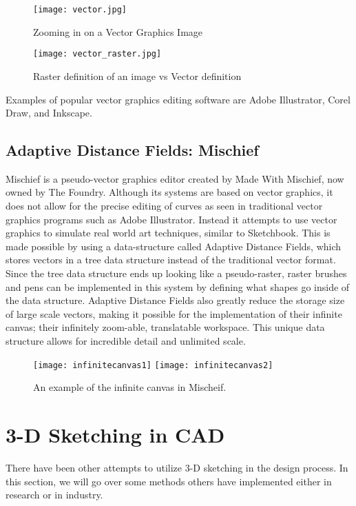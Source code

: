 \begin{figure}
\texttt{[image: vector.jpg]}
\caption{Zooming in on a Vector Graphics Image \autocite{printingcollection}}
\end{figure}

\begin{figure}
\texttt{[image: vector\_raster.jpg]}
\caption{Raster definition of an image vs Vector definition}
\end{figure}

Examples of popular vector graphics editing software are Adobe Illustrator, Corel Draw, and Inkscape.

\subsection{Adaptive Distance Fields: Mischief}

Mischief is a pseudo-vector graphics editor created by Made With Mischief, now owned by The Foundry. 
Although its systems are based on vector graphics, it does not allow for the precise editing of curves as seen in traditional vector graphics programs such as Adobe Illustrator. 
Instead it attempts to use vector graphics to simulate real world art techniques, similar to Sketchbook.
This is made possible by using a data-structure called Adaptive Distance Fields, which stores vectors in a tree data structure instead of the traditional vector format.
Since the tree data structure ends up looking like a pseudo-raster, raster brushes and pens can be implemented in this system by defining what shapes go inside of the data structure.
Adaptive Distance Fields also greatly reduce the storage size of large scale vectors, making it possible for the implementation of their infinite canvas; their infinitely zoom-able, translatable workspace. 
This unique data structure allows for incredible detail and unlimited scale.

\begin{figure}
\texttt{[image: infinitecanvas1]}
\texttt{[image: infinitecanvas2]}
\caption{An example of the infinite canvas in Mischeif.}
\end{figure}

\section{3-D Sketching in CAD}

There have been other attempts to utilize 3-D sketching in the design process. In this section, we will go over some methods others have implemented either in research or in industry.

